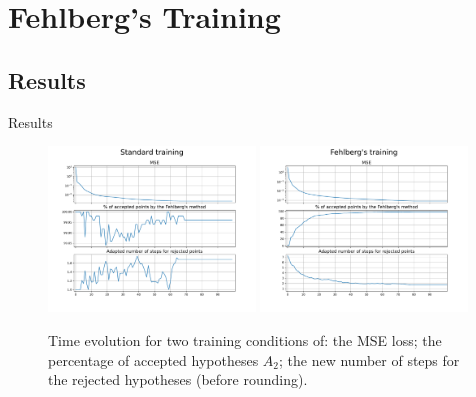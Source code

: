 \documentclass{EESD}
\begin{document}
\section{Fehlberg's Training}

\subsection{Results}
\begin{frame}{Results}
    \begin{figure}
        \centering
        \includegraphics[width=0.49\textwidth]{batch_training.pdf}
        \includegraphics[width=0.49\textwidth]{fehlberg_training.pdf}
        \caption{Time evolution for two training conditions of: the MSE loss; the percentage of accepted hypotheses $A_2$; the new number of steps for the rejected hypotheses (before rounding).}
        \label{fig:lorenz_error}
    \end{figure}                                                    
\end{frame}

\breakingframe{
\begin{textblock*}{15cm}(1.8cm,4cm)
\Huge\textbf{\textcolor{black}{Thank you for your attention!}}
\end{textblock*}
}


\end{document}
